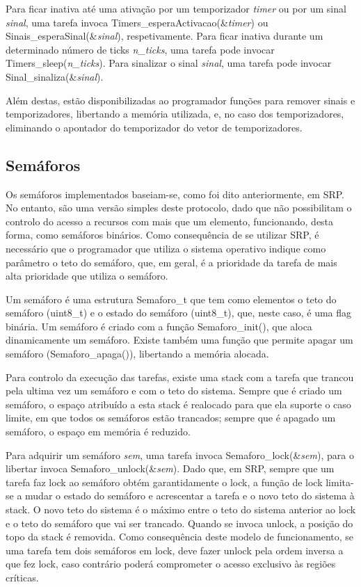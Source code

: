 \documentclass[journal]{IEEEtran}
\begin{document}
Para ficar inativa até uma ativação por um temporizador \emph{timer} ou por um sinal \emph{sinal}, uma tarefa invoca Timers\_esperaActivacao(\&\emph{timer}) ou
Sinais\_esperaSinal(\&\emph{sinal}), respetivamente.
Para ficar inativa durante um determinado número de ticks \emph{n\_ticks}, uma tarefa pode invocar Timers\_sleep(\emph{n\_ticks}).
Para sinalizar o sinal \emph{sinal}, uma tarefa pode invocar Sinal\_sinaliza(\&\emph{sinal}).

Além destas, estão disponibilizadas ao programador funções para remover sinais e temporizadores, libertando a memória utilizada, e, no caso dos temporizadores, eliminando
o apontador do temporizador do vetor de temporizadores.

\subsection{Semáforos}
Os semáforos implementados baseiam-se, como foi dito anteriormente, em SRP.
No entanto, são uma versão simples deste protocolo, dado que não possibilitam o controlo do acesso a recursos com mais que um elemento, funcionando, desta forma, como
semáforos binários.
Como consequência de se utilizar SRP, é necessário que o programador que utiliza o sistema operativo indique como parâmetro o teto do semáforo, que, em geral, é a
prioridade da tarefa de mais alta prioridade que utiliza o semáforo.

Um semáforo é uma estrutura Semaforo\_t que tem como elementos o teto do semáforo (uint8\_t) e o estado do semáforo (uint8\_t), que, neste caso, é uma flag binária.
Um semáforo é criado com a função Semaforo\_init(), que aloca dinamicamente um semáforo.
Existe também uma função que permite apagar um semáforo (Semaforo\_apaga()), libertando a memória alocada.

Para controlo da execução das tarefas, existe uma stack com a tarefa que trancou pela ultima vez um semáforo e com o teto do sistema.
Sempre que é criado um semáforo, o espaço atribuído a esta stack é realocado para que ela suporte o caso limite, em que todos os semáforos estão trancados; sempre que é
apagado um semáforo, o espaço em memória é reduzido.

Para adquirir um semáforo \emph{sem}, uma tarefa invoca Semaforo\_lock(\&\emph{sem}), para o libertar invoca Semaforo\_unlock(\&\emph{sem}).
Dado que, em SRP, sempre que um tarefa faz lock ao semáforo obtém garantidamente o lock, a função de lock limita-se a mudar o estado do semáforo e acrescentar a tarefa e
o novo teto do sistema à stack.
O novo teto do sistema é o máximo entre o teto do sistema anterior ao lock e o teto do semáforo que vai ser trancado.
Quando se invoca unlock, a posição do topo da stack é removida.
Como consequência deste modelo de funcionamento, se uma tarefa tem dois semáforos em lock, deve fazer unlock pela ordem inversa a que fez lock, caso contrário poderá
comprometer o acesso exclusivo às regiões críticas.
\end{document}
